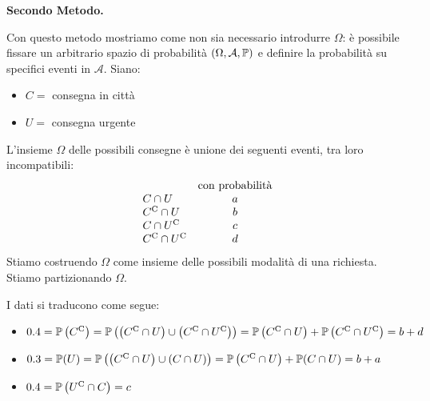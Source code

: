 \textbf{Secondo Metodo.}

Con questo metodo mostriamo come non sia necessario introdurre $\Omega $: è possibile fissare un arbitrario spazio di probabilità $( \Omega ,\mathcal{A} ,\mathbb{P})$ e definire la probabilità su specifici eventi in $\mathcal{A}$. Siano:
\begin{itemize}
	\item $C=$ consegna in città
	\item $U=$ consegna urgente
\end{itemize}

L'insieme $\Omega $ delle possibili consegne è unione dei seguenti eventi, tra loro incompatibili:
\[
	\begin{array}{lc}
			& \text{con probabilità}\\
		C\cap U & a\\
		C^{\mathrm{C}} \cap U & b\\
		C\cap U^{\mathrm{C}} & c\\
		C^{\mathrm{C}} \cap U^{\mathrm{C}} & d
	\end{array}
\]
Stiamo costruendo $\Omega $ come insieme delle possibili modalità di una richiesta. Stiamo partizionando $\Omega $.



I dati si traducono come segue:
\begin{itemize}
	\item $0.4=\mathbb{P}\left( C^{\mathrm{C}}\right) =\mathbb{P}\left(\left( C^{\mathrm{C}} \cap U\right) \cup \left( C^{\mathrm{C}} \cap U^{\mathrm{C}}\right)\right)=\mathbb{P}\left( C^{\mathrm{C}} \cap U\right) +\mathbb{P}\left( C^{\mathrm{C}} \cap U^{\mathrm{C}}\right)=b+d$
	\item $0.3=\mathbb{P}( U) =\mathbb{P}\left(\left( C^{\mathrm{C}} \cap U\right) \cup ( C\cap U)\right)=\mathbb{P}\left( C^{\mathrm{C}} \cap U\right) +\mathbb{P}( C\cap U)=b+a$
	\item $0.4=\mathbb{P}\left( U^{\mathrm{C}} \cap C\right) =c$
\end{itemize}

